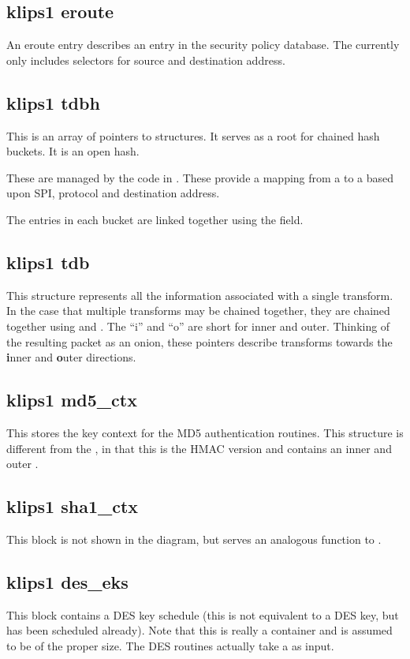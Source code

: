 \subsection{klips1 eroute}

An eroute entry describes an entry in the security policy database. The
 currently only includes selectors for source and destination address.

\subsection{klips1 tdbh}

This is an array of pointers to  structures. It serves as
a root for chained hash buckets. It is an open hash.

These are managed by the code in . These provide a
mapping from a  to a  based upon SPI,
protocol and destination address. 

The entries in each bucket are linked together using the 
field.

\subsection{klips1 tdb}

This structure represents all the information associated with a single
transform. In the case that multiple transforms may be chained together, they 
are chained together using  and . The ``i''
and ``o'' are short for inner and outer. Thinking of the resulting packet as
an onion, these pointers describe transforms towards the {\bf i}nner and {\bf 
o}uter directions.

\subsection{klips1 md5\_ctx}

This stores the key context for the MD5 authentication routines. This
structure is different from the , in that this is the HMAC
version and contains an inner and outer .

\subsection{klips1 sha1\_ctx}

This block is not shown in the diagram, but serves an analogous function to
. 

\subsection{klips1 des\_eks}

This block contains a DES key schedule (this is not equivalent to a DES key,
but has been scheduled already). Note that this is really a container
and is assumed to be of the proper size. The DES routines actually take a
 as input.



	
	
		
		
	
	
